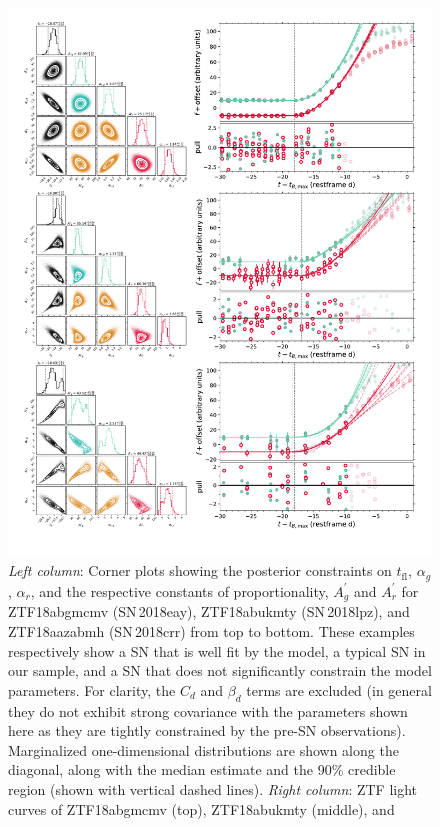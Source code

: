 \documentclass[twocolumn]{./aastex63}
\newcommand{\tfl}{$t_\mathrm{fl}$}
\begin{document}
\begin{figure}
    \centering
    \includegraphics[width=5.75in]{./figures/corner_LC.pdf}
    \caption{\textit{Left column}: Corner plots showing the posterior
    constraints on \tfl, $\alpha_g$, $\alpha_r$, and the respective constants
    of proportionality, $A_g^\prime$ and $A_r^\prime$ for ZTF18abgmcmv
    (SN\,2018eay), ZTF18abukmty (SN\,2018lpz), and ZTF18aazabmh (SN\,2018crr)
    from top to bottom. These examples respectively show a SN that is well fit
    by the model, a typical SN in our sample, and a SN that does not
    significantly constrain the model parameters. For clarity, the $C_d$ and
    $\beta_d$ terms are excluded (in general they do not exhibit strong
    covariance with the parameters shown here as they are tightly constrained
    by the pre-SN observations). Marginalized one-dimensional distributions
    are shown along the diagonal, along with the median estimate and the 90\%
    credible region (shown with vertical dashed lines). \textit{Right column}:
    ZTF light curves of ZTF18abgmcmv (top), ZTF18abukmty (middle), and
}
\end{figure}
\end{document}
